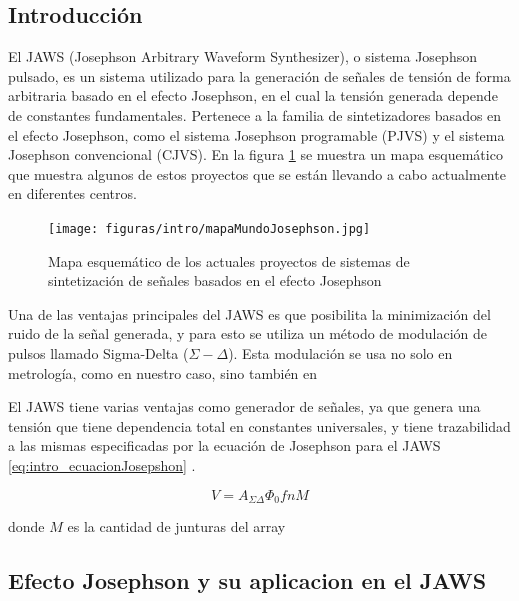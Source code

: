 \documentclass[twoside]{article}
\begin{document}
\begin{multicols}{2}

\section{Introducción}

El JAWS (Josephson Arbitrary Waveform Synthesizer), o sistema Josephson pulsado, es un sistema utilizado para la generación de señales de tensión de forma arbitraria basado en el efecto Josephson, en el cual la tensión generada depende de constantes fundamentales. Pertenece a la familia de sintetizadores basados en el efecto Josephson, como el sistema Josephson programable (PJVS) y el sistema Josephson convencional (CJVS). En la figura \ref{fig:intro_mapaMundoJosephson} se muestra un mapa esquemático que muestra algunos de estos proyectos que se están llevando a cabo actualmente en diferentes centros.
\begin{figure}[H]
    \centering
    \texttt{[image: figuras/intro/mapaMundoJosephson.jpg]}
    \caption{Mapa esquemático de los actuales proyectos de sistemas de sintetización de señales basados en el efecto Josephson}
    \label{fig:intro_mapaMundoJosephson}
\end{figure}

Una de las ventajas principales del JAWS es que posibilita la minimización del ruido de la señal generada, y para esto se utiliza un método de modulación de pulsos llamado Sigma-Delta ($\Sigma-\Delta$). Esta modulación se usa no solo en metrología, como en nuestro caso, sino también en 

El JAWS tiene varias ventajas como generador de señales, ya que genera una tensión que tiene dependencia total en constantes universales, y tiene trazabilidad a las mismas especificadas por la ecuación de Josephson para el JAWS \ref{eq:intro_ecuacionJosepshon} \cite{behr2012}.

\begin{equation}
    V = A_{\Sigma\Delta} \Phi_0 f n M
    \label{eq:intro_ecuacionJosephson}
\end{equation}

donde $M$ es la cantidad de junturas del array

    \subsection{Efecto Josephson y su aplicacion en el JAWS}


\end{multicols}
\end{document}
